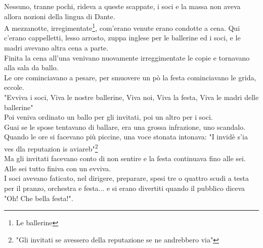 \documentclass[10pt]{memoir} %
\begin{document}
Nessuno, tranne pochi, rideva a queste scappate, i soci e la massa non aveva allora nozioni della lingua di Dante.\\
A mezzanotte, irregimentate\footnote{Le ballerine}, com'erano venute erano condotte a cena. Qui c'erano cappelletti, lesso arrosto, zuppa inglese per le ballerine ed i soci, e le madri avevano altra cena a parte.\\
Finita la cena all'una venivano nuovamente irreggimentate le copie e tornavano alla sala da ballo.\\
Le ore cominciavano a pesare, per smuovere un pò la festa cominciavano le grida, eccole.\\
"Evviva i soci, Viva le nostre ballerine, Viva noi, Viva la festa, Viva le madri delle ballerine"\\
Poi veniva ordinato un ballo per gli invitati, poi un altro per i soci.\\
Guai se le spose tentavano di ballare, era una grossa infrazione, uno scandalo.\\
Quando le ore si facevano più piccine, una voce stonata intonava: "I invidè s'ia ves dla reputazion is aviareb"\footnote{"Gli invitati se avessero della reputazione se ne andrebbero via"}\\
Ma gli invitati facevano conto di non sentire e la festa continuava fino alle sei. Alle sei tutto finiva con un evviva.\\
I soci avevano faticato, nel dirigere, preparare, spesi tre o quattro scudi a testa per il pranzo, orchestra e festa... e si erano divertiti quando il pubblico diceva "Oh! Che bella festa!".

\end{document}
